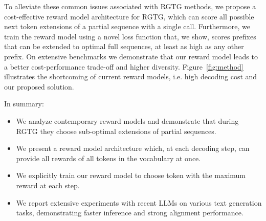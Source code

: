 To alleviate these common issues associated with RGTG methods, we propose a cost-effective reward model architecture for RGTG, which can score all possible next token extensions of a partial sequence with a single call. Furthermore, we train the reward model using a novel loss function that, we show, scores prefixes that can be extended to optimal full sequences, at least as high as any other prefix. On extensive benchmarks we demonstrate that our reward model leads to a better cost-performance trade-off and higher diversity. Figure~\ref{fig:method} illustrates the shortcoming of current reward models, i.e. high decoding cost and our proposed solution.





In summary:
%
\begin{itemize}
    \item We analyze contemporary reward models and demonstrate that during RGTG they choose sub-optimal extensions of partial sequences.
    \item We present a reward model architecture which, at each decoding step, can provide all rewards of all tokens in the vocabulary at once.
    \item We explicitly train our reward model to choose token with the maximum reward at each step.
    \item We report extensive experiments with recent LLMs on various text generation tasks, demonstrating faster inference and strong alignment performance.
\end{itemize}



